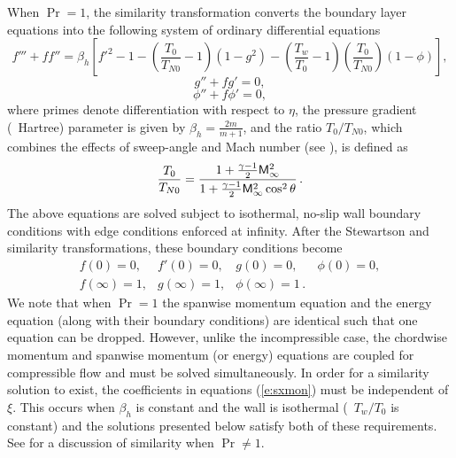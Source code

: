When $\Pr=1$, the similarity transformation converts the boundary layer
equations into the following system of ordinary differential equations
%
\begin{equation} \label{e:sxmon}
f''' + f f'' = \beta_h \left[ {f'}^2 - 1 - 
               \left( \frac{T_0}{T_{N0}} - 1 \right ) (1 - g^2) - 
               \left( \frac{T_w}{T_0} - 1 \right) 
	       \left(\frac{T_0}{T_{N0}}\right) (1 - \phi) \right] \comma
\end{equation}
%
\begin{equation} \label{e:szmon} 
g'' + f g' = 0  \comma
\end{equation}
%
\begin{equation} \label{e:senergy}
\phi'' + f \phi' = 0  \comma
\end{equation}
%
where primes denote differentiation with respect to $\eta$, the pressure
gradient (\ie\ Hartree) parameter is given by $\beta_h =
\frac{2m}{m+1}$, and the ratio $T_0/T_{N0}$, which combines the effects of
sweep-angle and Mach number (see \cite{ReBe:58}), is defined as
%
\begin{equation}
  \frac{T_0}{T_{N0}} = \frac{1 + \frac{\gamma-1}{2} {\sf M}^2_\infty}
                       {1 + \frac{\gamma-1}{2} {\sf M}^2_\infty \cos^2\theta} 
                       {\, .}
\end{equation}
%
The above equations are solved subject to isothermal, no-slip wall boundary
conditions with edge conditions enforced at infinity.  After the Stewartson
and similarity transformations, these boundary conditions become
%
\begin{equation}
\begin{array}{llll}
  f(0) = 0 , &
  f'(0) = 0, &
  g(0) = 0 , &
  \phi(0) = 0 , \\[0.1in]
  f(\infty) = 1 , &
  g(\infty) = 1 , &
  \phi(\infty) = 1 \period
\end{array}
\end{equation}
%
We note that when $\Pr=1$ the spanwise momentum equation and the energy
equation (along with their boundary conditions) are identical such that one
equation can be dropped.  However, unlike the incompressible case, the
chordwise momentum and spanwise momentum (or energy) equations are coupled for
compressible flow and must be solved simultaneously.  In order for a
similarity solution to exist, the coefficients in equations (\ref{e:sxmon})
must be independent of $\xi$.  This occurs when $\beta_h$ is constant and the
wall is isothermal (\ie\ $T_w/T_0$ is constant) and the solutions presented
below satisfy both of these requirements.  See \cite{ReBe:58} for a discussion
of similarity when $\Pr \ne 1$.

